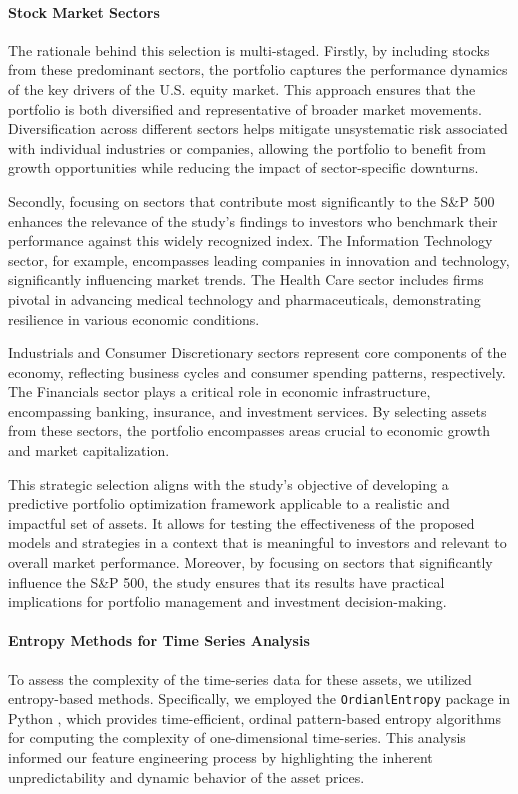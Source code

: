 \paragraph{Stock Market Sectors}
The rationale behind this selection is multi-staged. Firstly, by including stocks from these predominant sectors, the portfolio captures the performance dynamics of the key drivers of the U.S. equity market. This approach ensures that the portfolio is both diversified and representative of broader market movements. Diversification across different sectors helps mitigate unsystematic risk associated with individual industries or companies, allowing the portfolio to benefit from growth opportunities while reducing the impact of sector-specific downturns.

Secondly, focusing on sectors that contribute most significantly to the S\&P 500 enhances the relevance of the study's findings to investors who benchmark their performance against this widely recognized index. The Information Technology sector, for example, encompasses leading companies in innovation and technology, significantly influencing market trends. The Health Care sector includes firms pivotal in advancing medical technology and pharmaceuticals, demonstrating resilience in various economic conditions.

Industrials and Consumer Discretionary sectors represent core components of the economy, reflecting business cycles and consumer spending patterns, respectively. The Financials sector plays a critical role in economic infrastructure, encompassing banking, insurance, and investment services. By selecting assets from these sectors, the portfolio encompasses areas crucial to economic growth and market capitalization.

This strategic selection aligns with the study's objective of developing a predictive portfolio optimization framework applicable to a realistic and impactful set of assets. It allows for testing the effectiveness of the proposed models and strategies in a context that is meaningful to investors and relevant to overall market performance. Moreover, by focusing on sectors that significantly influence the S\&P 500, the study ensures that its results have practical implications for portfolio management and investment decision-making.

\paragraph{Entropy Methods for Time Series Analysis}
To assess the complexity of the time-series data for these assets, we utilized entropy-based methods. Specifically, we employed the \texttt{OrdianlEntropy} package in Python \cite{OrdinalEntroPy}, which provides time-efficient, ordinal pattern-based entropy algorithms for computing the complexity of one-dimensional time-series. This analysis informed our feature engineering process by highlighting the inherent unpredictability and dynamic behavior of the asset prices.


